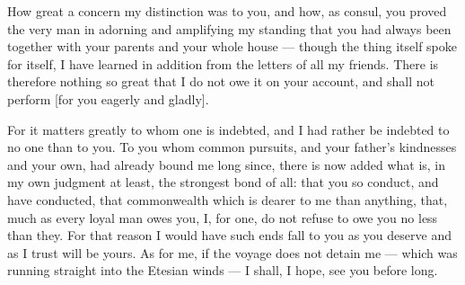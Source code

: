 

 How great a concern my distinction was to you, and how, as consul, you proved the very man in adorning and amplifying my standing that you had always been together with your parents and your whole house --- though the thing itself spoke for itself, I have learned in addition from the letters of all my friends. There is therefore nothing so great that I do not owe it on your account, and shall not perform [for you eagerly and gladly].

 For it matters greatly to whom one is indebted, and I had rather be indebted to no one than to you. To you whom common pursuits, and your father's kindnesses and your own, had already bound me long since, there is now added what is, in my own judgment at least, the strongest bond of all: that you so conduct, and have conducted, that commonwealth which is dearer to me than anything, that, much as every loyal man owes you, I, for one, do not refuse to owe you no less than they. For that reason I would have such ends fall to you as you deserve and as I trust will be yours. As for me, if the voyage does not detain me --- which was running straight into the Etesian winds --- I shall, I hope, see you before long.
